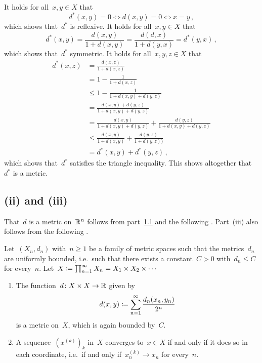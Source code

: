 \section{}





\subsection{}
\label{new metric}

It holds for all~$x, y \in X$ that
\[
        d^*(x,y) = 0
  \iff  d(x,y) = 0
  \iff  x = y \,,
\]
which shows that~$d^*$ is reflexive.
It holds for all~$x, y \in X$ that
\[
    d^*(x,y)
  = \frac{d(x,y)}{1 + d(x,y)}
  = \frac{d(d,x)}{1 + d(y,x)}
  = d^*(y,x) \,,
\]
which shows that~$d^*$ symmetric.
It holds for all~$x, y, z \in X$ that
\begin{align*}
          d^*(x,z)
  &=      \frac{d(x,z)}{1 + d(x,z)} \\
  &=      1 - \frac{1}{1 + d(x,z)}  \\
  &\leq   1 - \frac{1}{1 + d(x,y) + d(y,z)} \\
  &=      \frac{d(x,y) + d(y,z)}{1 + d(x,y) + d(y,z)} \\
  &=      \frac{d(x,y)}{1 + d(x,y) + d(y,z)} + \frac{d(y,z)}{1 + d(x,y) + d(y,z)} \\
  &\leq   \frac{d(x,y)}{1 + d(x,y)} + \frac{d(y,z)}{1 + d(y,z))}  \\
  &=      d^*(x,y) + d^*(y,z) \,,
\end{align*}
which shows that~$d^*$ satisfies the triangle inequality.
This shows altogether that~$d^*$ is a metric.





\subsection*{(ii) and (iii)}

That~$d$ is a metric on~$\mathbb{R}^n$ follows from part~\ref{new metric} and the following .
Part~(iii) also follows from the following .

\begin{lemma}
  \label{point set topology}
  Let~$(X_n, d_n)$ with~$n \geq 1$ be a family of metric spaces such that the metrics~$d_n$ are uniformly bounded, i.e.\ such that there exists a constant~$C > 0$ with~$d_n \leq C$ for every~$n$.
  Let~$X \coloneqq \prod_{n=1}^\infty X_n = X_1 \times X_2 \times \dotsb$
  \begin{enumerate}
    \item
      The function~$d \colon X \times X \to \mathbb{R}$ given by
      \[
                  d(x,y)
        \coloneqq  \sum_{n=1}^\infty \frac{d_n(x_n, y_n)}{2^n}
      \]
      is a {\welldef} metric on~$X$, which is again bounded by~$C$.
    \item
      A sequence~$( x^{(k)} )_k$ in~$X$ converges to~$x \in X$ if and only if it does so in each coordinate, i.e.\ if and only if~$x^{(k)}_n \to x_n$ for every~$n$.
  \end{enumerate}
\end{lemma}

